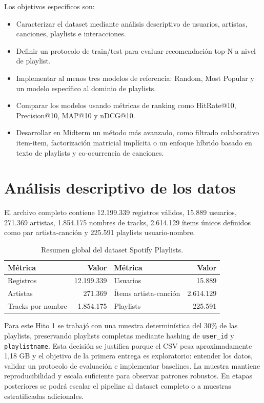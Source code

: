 \documentclass[10pt,letterpaper]{article}
\begin{document}
Los objetivos específicos son:
\begin{itemize}
    \item Caracterizar el dataset mediante análisis descriptivo de usuarios, artistas, canciones, playlists e interacciones.
    \item Definir un protocolo de train/test para evaluar recomendación top-N a nivel de playlist.
    \item Implementar al menos tres modelos de referencia: Random, Most Popular y un modelo específico al dominio de playlists.
    \item Comparar los modelos usando métricas de ranking como HitRate@10, Precision@10, MAP@10 y nDCG@10.
    \item Desarrollar en Midterm un método más avanzado, como filtrado colaborativo item-item, factorización matricial implícita o un enfoque híbrido basado en texto de playlists y co-ocurrencia de canciones.
\end{itemize}

\section{Análisis descriptivo de los datos}

El archivo completo contiene 12.199.339 registros válidos, 15.889 usuarios, 271.369 artistas, 1.854.175 nombres de tracks, 2.614.129 ítems únicos definidos como par artista-canción y 225.591 playlists usuario-nombre.

\begin{table}[h]
\centering
\small
\begin{tabular}{lrlr}
\toprule
\textbf{Métrica} & \textbf{Valor} & \textbf{Métrica} & \textbf{Valor}\\
\midrule
Registros & 12.199.339 & Usuarios & 15.889\\
Artistas & 271.369 & Ítems artista-canción & 2.614.129\\
Tracks por nombre & 1.854.175 & Playlists & 225.591\\
\bottomrule
\end{tabular}
\caption{Resumen global del dataset Spotify Playlists.}
\label{tab:dataset}
\end{table}

Para este Hito 1 se trabajó con una muestra determinística del 30\% de las playlists, preservando playlists completas mediante hashing de \texttt{user\_id} y \texttt{playlistname}. Esta decisión se justifica porque el CSV pesa aproximadamente 1,18 GB y el objetivo de la primera entrega es exploratorio: entender los datos, validar un protocolo de evaluación e implementar baselines. La muestra mantiene reproducibilidad y escala suficiente para observar patrones robustos. En etapas posteriores se podrá escalar el pipeline al dataset completo o a muestras estratificadas adicionales.
\end{document}
